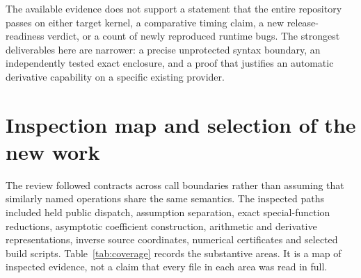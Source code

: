\documentclass[11pt,a4paper]{article}
\begin{document}
The available evidence does not support a statement that the entire repository passes on either target kernel, a comparative timing claim, a new release-readiness verdict, or a count of newly reproduced runtime bugs. The strongest deliverables here are narrower: a precise unprotected syntax boundary, an independently tested exact enclosure, and a proof that justifies an automatic derivative capability on a specific existing provider.

\section{Inspection map and selection of the new work}\label{sec:map}

The review followed contracts across call boundaries rather than assuming that similarly named operations share the same semantics. The inspected paths included held public dispatch, assumption separation, exact special-function reductions, asymptotic coefficient construction, arithmetic and derivative representations, inverse source coordinates, numerical certificates and selected build scripts. Table~\ref{tab:coverage} records the substantive areas. It is a map of inspected evidence, not a claim that every file in each area was read in full.
\end{document}
